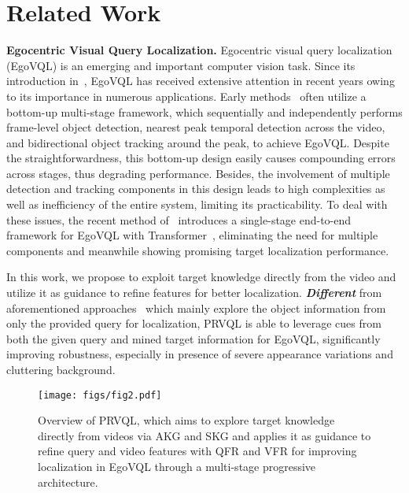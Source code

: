 \section{Related Work}

\textbf{Egocentric Visual Query Localization.} Egocentric visual query localization (EgoVQL) is an emerging and important computer vision task. Since its introduction in~\cite{grauman2022ego4d}, EgoVQL has received extensive attention in recent years owing to its importance in numerous applications. Early methods~\cite{grauman2022ego4d,xu2022negative,xu2023my} often utilize a bottom-up multi-stage framework, which sequentially and independently performs frame-level object detection, nearest peak temporal detection across the video, and bidirectional object tracking around the peak, to achieve EgoVQL. Despite the straightforwardness, this bottom-up design easily causes compounding errors across stages, thus degrading performance. Besides, the involvement of multiple detection and tracking components in this design leads to high complexities as well as inefficiency of the entire system, limiting its practicability. To deal with these issues, the recent method of~\cite{jiang2024single} introduces a single-stage end-to-end framework for EgoVQL with Transformer~\cite{VaswaniSPUJGKP17}, eliminating the need for multiple components and meanwhile showing promising target localization performance.

In this work, we propose to exploit target knowledge directly from the video and utilize it as guidance to refine features for better localization. \textbf{\emph{Different}} from aforementioned approaches~\cite{grauman2022ego4d,xu2022negative,xu2023my,jiang2024single} which mainly explore the object information from only the provided query for localization, PRVQL is able to leverage cues from both the given query and mined target information for EgoVQL, significantly improving robustness, especially in presence of severe appearance variations and cluttering background.

\begin{figure*}[!t]
	\centering
        \texttt{[image: figs/fig2.pdf]}\vspace{-2mm}
	\caption{Overview of PRVQL, which aims to explore target knowledge directly from videos via AKG and SKG and applies it as guidance to refine query and video features with QFR and VFR for improving localization in EgoVQL through a multi-stage progressive architecture.}
	\label{fig:framework}\vspace{-4mm}	
\end{figure*}

